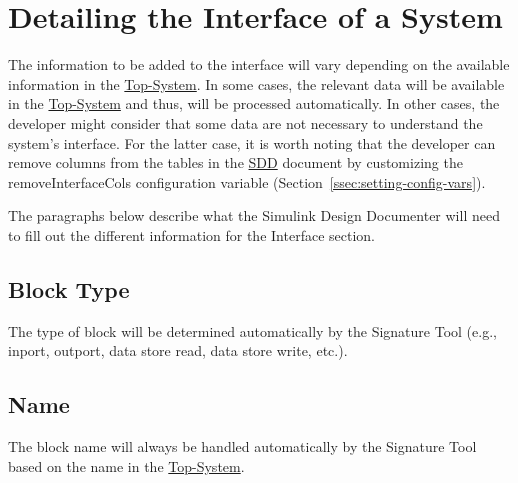\documentclass{mcscert}
\newcommand{\sigtool}{Signature Tool}
\newcommand{\sddtool}{Simulink Design Documenter}
\newcommand{\topsystemnolink}{Top-System} %
\newcommand{\topsystem}{\hyperref[def:topsystem]{\topsystemnolink{}}}
\begin{document}
\section{Detailing the Interface of a \simulink{} System} 
\label{sec:interface-details}
The information to be added to the interface will vary depending on the available information in the \topsystem{}. 
In some cases, the relevant data will be available in the \topsystem{} and thus, will be processed automatically. 
In other cases, the developer might consider that some data are not necessary to understand the system's interface. 
For the latter case, it is worth noting that the developer can remove columns from the tables in the \hyperref[acr:sdd]{SDD} document by customizing the removeInterfaceCols configuration variable (Section~\ref{ssec:setting-config-vars}).
    
The paragraphs below describe what the \sddtool{} will need to fill out the different information for the Interface section.
	  
	\subsection{Block Type} 
	\label{ssec:include-int-blk-type}
	The type of block will be determined automatically by the \sigtool{} (e.g., inport, outport, data store read, data store write, etc.).

	\subsection{Name}
	\label{ssec:include-int-name}
	The \simulink{} block name will always be handled automatically by the \sigtool{} based on the name in the \topsystem{}.
	  
\end{document}
